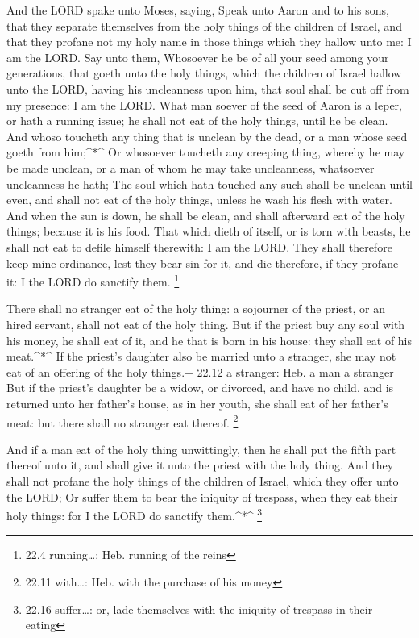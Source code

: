  And the LORD spake unto Moses, saying,  Speak
unto Aaron and to his sons, that they separate themselves from the holy
things of the children of Israel, and that they profane not my holy name
in those things which they hallow unto me: I am the LORD. 
Say unto them, Whosoever he be of all your seed among your generations,
that goeth unto the holy things, which the children of Israel hallow
unto the LORD, having his uncleanness upon him, that soul shall be cut
off from my presence: I am the LORD.  What man soever of the
seed of Aaron is a leper, or hath a running issue; he shall not eat of
the holy things, until he be clean. And whoso toucheth any thing that is
unclean by the dead, or a man whose seed goeth from him;\^{}*\^{}
 Or whosoever toucheth any creeping thing, whereby he may be
made unclean, or a man of whom he may take uncleanness, whatsoever
uncleanness he hath;  The soul which hath touched any such
shall be unclean until even, and shall not eat of the holy things,
unless he wash his flesh with water.  And when the sun is
down, he shall be clean, and shall afterward eat of the holy things;
because it is his food.  That which dieth of itself, or is
torn with beasts, he shall not eat to defile himself therewith: I am the
LORD.  They shall therefore keep mine ordinance, lest they
bear sin for it, and die therefore, if they profane it: I the LORD do
sanctify them. \footnote{22.4 running\ldots: Heb. running of the reins}

 There shall no stranger eat of the holy thing: a sojourner
of the priest, or an hired servant, shall not eat of the holy thing.
 But if the priest buy any soul with his money, he shall
eat of it, and he that is born in his house: they shall eat of his
meat.\^{}*\^{}  If the priest's daughter also be married
unto a stranger, she may not eat of an offering of the holy things.+
22.12 a stranger: Heb. a man a stranger  But if the
priest's daughter be a widow, or divorced, and have no child, and is
returned unto her father's house, as in her youth, she shall eat of her
father's meat: but there shall no stranger eat thereof. \footnote{22.11
  with\ldots: Heb. with the purchase of his money}

 And if a man eat of the holy thing unwittingly, then he
shall put the fifth part thereof unto it, and shall give it unto the
priest with the holy thing.  And they shall not profane the
holy things of the children of Israel, which they offer unto the LORD;
 Or suffer them to bear the iniquity of trespass, when they
eat their holy things: for I the LORD do sanctify them.\^{}*\^{}
\footnote{22.16 suffer\ldots: or, lade themselves with the iniquity of
  trespass in their eating}

